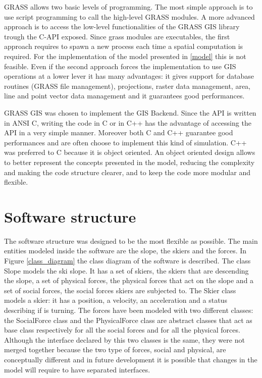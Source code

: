 \documentclass[12pt,a4paper,twoside]{book}
\begin{document}
GRASS allows two basic levels of programming. The most simple approach is to use script programming to call the high-level GRASS modules. A more advanced approach is to access the low-level functionalities of the GRASS GIS library trough the C-API exposed. Since grass modules are executables, the first approach requires to spawn a new process each time a spatial computation is required. For the implementation of the model presented in \ref{model} this is not feasible. Even if the second approach forces the implementation to use GIS operations at a lower lever it has many advantages: it gives support for database routines (GRASS file management), projections, raster data management, area, line and point vector data management \cite{net2008} and it guarantees good performances.

GRASS GIS was chosen to implement the GIS Backend. Since the API is written in ANSI C, writing the code in C or in C++ has the advantage of accessing the API in a very simple manner. Moreover both C and C++ guarantee good performances and are often choose to implement this kind of simulation. C++ was preferred to C because it is object oriented. An object oriented design allows to better represent the concepts presented in the model, reducing the complexity and making the code structure clearer, and to keep the code more modular and flexible.

\section{Software structure}
The software structure was designed to be the most flexible as possible. The main entities modeled inside the software are the slope, the skiers and the forces. In Figure \ref{class_diagram} the class diagram of the software is described. The class Slope models the ski slope. It has a set of skiers, the skiers that are descending the slope, a set of physical forces, the physical forces that act on the slope and a set of social forces, the social forces skiers are subjected to. The Skier class models a skier: it has a position, a velocity, an acceleration and a status describing if is turning. The forces have been modeled with two different classes: the SocialForce class and the PhysicalForce class are abstract classes that act as base class respectively for all the social forces and for all the physical forces. Although the interface declared by this two classes is the same, they were not merged together because the two type of forces, social and physical, are conceptually different and in future development it is possible that changes in the model will require to have separated interfaces.
\end{document}
